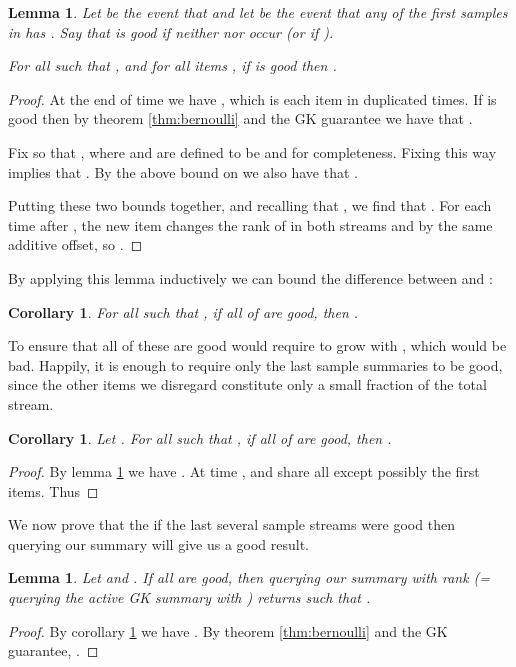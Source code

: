 \documentclass{article}
\theoremstyle{plain}
\newtheorem{lemma}[theorem]{Lemma}
\newtheorem{corollary}[theorem]{Corollary}
\begin{document}
\begin{lemma}
  \label{lem:online-error-indstep}
  Let  be the event that  and let  be the
  event that any of the first  samples  in  has . Say that  is \emph{good}
  if neither  nor  occur (or if ).

  For all  such that , and for all items , if
   is good then .
\end{lemma}
\begin{proof}
  At the end of time  we have , which is each item
   in  duplicated  times. If 
  is good then by theorem \ref{thm:bernoulli} and the GK guarantee we have that
  .

  Fix  so that , where  and
   are defined to be  and  for
  completeness. Fixing  this way implies that . By the above bound on  we also
  have that .

  Putting these two bounds together, and recalling that , we find that . For each time  after , the new item  changes the rank
  of  in both streams  and  by the same additive offset, so
  .
\end{proof}

By applying this lemma inductively we can bound the difference between  and
:

\begin{corollary}
  For all  such that , if all of   are good, then .
\end{corollary}

To ensure that all of these  are good would require  to grow with ,
which would be bad. Happily, it is enough to require only the last  sample summaries to be good, since the other items we disregard
constitute only a small fraction of the total stream.

\begin{corollary}
  \label{cor:online-error-lastgood}
  Let . For all  such that ,
  if all of  are good, then
  .
\end{corollary}
\begin{proof}\let\qed\relax
  By lemma \ref{lem:online-error-indstep} we have . At time , 
  and  share all except possibly the first  items. Thus
  
\end{proof}

We now prove that the if the last several sample streams were good then querying
our summary will give us a good result.

\begin{lemma}
  \label{lem:online-error-querygood}
  Let  and . If all  are good, then querying our
  summary with rank  (= querying the active GK summary  with ) returns  such that .
\end{lemma}
\begin{proof}
  By corollary \ref{cor:online-error-lastgood} we have . By theorem
  \ref{thm:bernoulli} and the GK guarantee, .
\end{proof}
\end{document}
